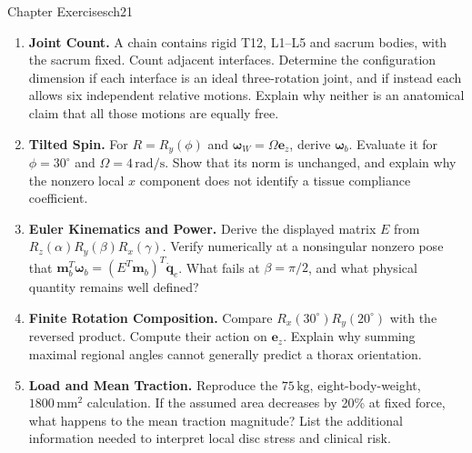 \begin{exercises}{Chapter Exercises}{ch21}
\begin{enumerate}[leftmargin=*,itemsep=8pt,topsep=4pt]
\item \begin{minipage}[t]{\linewidth}
\textbf{Joint Count.} A chain contains rigid T12, L1--L5 and sacrum bodies, with the sacrum fixed. Count adjacent interfaces. Determine the configuration dimension if each interface is an ideal three-rotation joint, and if instead each allows six independent relative motions. Explain why neither is an anatomical claim that all those motions are equally free.
\end{minipage}

\item \begin{minipage}[t]{\linewidth}
\textbf{Tilted Spin.} For $R=R_y(\phi)$ and $\bm\omega_W=\Omega\bm e_z$, derive $\bm\omega_b$. Evaluate it for $\phi=30^\circ$ and $\Omega=4\,\mathrm{rad/s}$. Show that its norm is unchanged, and explain why the nonzero local $x$ component does not identify a tissue compliance coefficient.
\end{minipage}

\item \begin{minipage}[t]{\linewidth}
\textbf{Euler Kinematics and Power.} Derive the displayed matrix $E$ from $R_z(\alpha)R_y(\beta)R_x(\gamma)$. Verify numerically at a nonsingular nonzero pose that $\bm m_b^T\bm\omega_b=(E^T\bm m_b)^T\dot{\bm q}_e$. What fails at $\beta=\pi/2$, and what physical quantity remains well defined?
\end{minipage}

\item \begin{minipage}[t]{\linewidth}
\textbf{Finite Rotation Composition.} Compare $R_x(30^\circ)R_y(20^\circ)$ with the reversed product. Compute their action on $\bm e_z$. Explain why summing maximal regional angles cannot generally predict a thorax orientation.
\end{minipage}

\item \begin{minipage}[t]{\linewidth}
\textbf{Load and Mean Traction.} Reproduce the $75\,\mathrm{kg}$, eight-body-weight, $1800\,\mathrm{mm^2}$ calculation. If the assumed area decreases by 20\% at fixed force, what happens to the mean traction magnitude? List the additional information needed to interpret local disc stress and clinical risk.
\end{minipage}


\end{enumerate}
\end{exercises}
